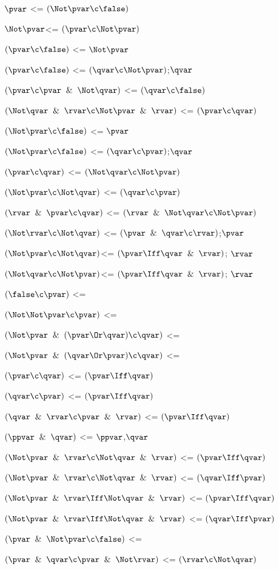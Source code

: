 $\pvar $ <= $(\Not \pvar \c \false)$

$\Not\pvar$<= $(\pvar \c \Not\pvar)$

$(\pvar \c \false)$ <= $\Not \pvar$

$(\pvar \c \false)$ <= $(\qvar \c \Not \pvar)$;$\qvar$

$(\pvar \c \pvar \And \Not \qvar )$ <= $( \qvar \c \false)$

$(\Not \qvar \And \rvar \c \Not \pvar \And \rvar)$ <= $(\pvar \c \qvar)$

$(\Not \pvar \c \false)$ <= $\pvar$

$(\Not \pvar \c \false)$ <= $(\qvar \c \pvar)$;$\qvar$

$(\pvar \c \qvar)$ <= $(\Not \qvar \c \Not \pvar)$

$(\Not \pvar \c \Not \qvar)$ <= $(\qvar \c \pvar)$

$(\rvar \And \pvar \c \qvar)$ <= $(\rvar \And \Not \qvar \c \Not \pvar)$

$(\Not \rvar \c \Not \qvar)$ <= $(\pvar\And\qvar\c\rvar)$;$\pvar$

$(\Not \pvar \c \Not \qvar)$<= $(\pvar \Iff \qvar \And \rvar)$; $\rvar$

$(\Not \qvar \c \Not \pvar)$<= $(\pvar \Iff \qvar \And \rvar)$; $\rvar$

$(\false \c \pvar)$ <=

$(\Not \Not \pvar \c \pvar)$ <=

$(\Not \pvar \And (\pvar \Or \qvar) \c \qvar)$ <=

$(\Not \pvar \And (\qvar \Or \pvar) \c \qvar)$ <=

$(\pvar \c \qvar)$ <= $(\pvar \Iff \qvar)$

$(\qvar \c \pvar)$ <= $(\pvar \Iff \qvar)$

$(\qvar \And \rvar\c \pvar\And \rvar)$ <= $(\pvar \Iff \qvar)$

$(\ppvar \And \qvar)$ <=  $\ppvar$,$\qvar$ 

$(\Not \pvar \And \rvar \c \Not \qvar \And \rvar)$ <= $(\pvar \Iff \qvar)$

$(\Not \pvar \And \rvar \c \Not \qvar \And \rvar)$ <= $(\qvar \Iff \pvar)$

$(\Not \pvar \And \rvar \Iff \Not \qvar \And \rvar)$ <= $(\pvar \Iff \qvar)$

$(\Not \pvar \And \rvar \Iff \Not \qvar \And \rvar)$ <= $(\qvar \Iff \pvar)$

$(\pvar \And \Not \pvar \c \false)$ <=

$(\pvar \And \qvar \c \pvar \And \Not\rvar)$ <= $(\rvar \c \Not \qvar)$

